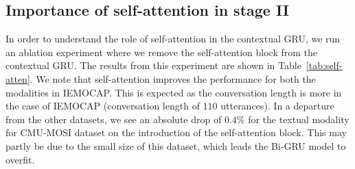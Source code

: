 \documentclass[lettersize,journal]{IEEEtran}
\begin{document}
\subsection{Importance of self-attention in stage II}
In order to understand the role of self-attention  in the contextual GRU, we run an ablation experiment where we remove the self-attention block from the contextual GRU. The results from this experiment are shown in Table~\ref{tab:self-atten}. We note that self-attention improves the performance for both the modalities  in IEMOCAP. This is expected as the conversation length is more in the case of IEMOCAP (conversation length of $110$ utterances). In a departure from the other datasets, we see an absolute drop of $0.4\%$ for the textual modality for CMU-MOSI dataset on the introduction of the self-attention block. This may partly be due to the small size of this dataset, which leads the Bi-GRU model to overfit.
\end{document}
